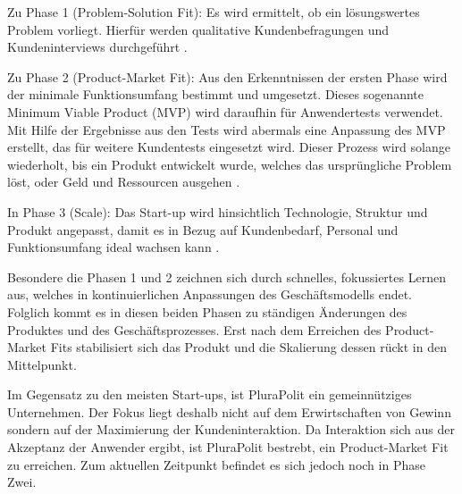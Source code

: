 Zu Phase 1 (Problem-Solution Fit):
Es wird ermittelt, ob ein lösungswertes Problem vorliegt. Hierfür werden qualitative Kundenbefragungen und Kundeninterviews durchgeführt \parencite[vgl.][S. 170 ff.]{croll_lean_2013}.

Zu Phase 2 (Product-Market Fit):
 Aus den Erkenntnissen der ersten Phase wird der minimale Funktionsumfang bestimmt und umgesetzt. Dieses sogenannte Minimum Viable Product (MVP) wird daraufhin für Anwendertests verwendet. Mit Hilfe der Ergebnisse aus den Tests wird abermals eine Anpassung des MVP erstellt, das für weitere Kundentests eingesetzt wird. Dieser Prozess wird solange wiederholt, bis ein Produkt entwickelt wurde, welches das ursprüngliche Problem löst, oder Geld und Ressourcen ausgehen \parencite[vgl.][S. 28]{croll_lean_2013}.

In Phase 3 (Scale):
Das Start-up wird hinsichtlich Technologie, Struktur und Produkt angepasst, damit es in Bezug auf Kundenbedarf, Personal und Funktionsumfang ideal wachsen kann \parencite[vgl.][S. 9]{maurya_running_2012}.

Besondere die Phasen 1 und 2 zeichnen sich durch schnelles, fokussiertes Lernen aus, welches in kontinuierlichen Anpassungen des Geschäftsmodells endet. Folglich kommt es in diesen beiden Phasen zu ständigen Änderungen des Produktes und des Geschäftsprozesses. Erst nach dem Erreichen des Product-Market Fits stabilisiert sich das Produkt und die Skalierung dessen rückt in den Mittelpunkt.

Im Gegensatz zu den meisten Start-ups, ist PluraPolit ein gemeinnütziges Unternehmen. Der Fokus liegt deshalb nicht auf dem Erwirtschaften von Gewinn sondern auf der Maximierung der Kundeninteraktion. Da Interaktion sich aus der Akzeptanz der Anwender ergibt, ist PluraPolit bestrebt, ein Product-Market Fit zu erreichen. Zum aktuellen Zeitpunkt befindet es sich jedoch noch in Phase Zwei.
